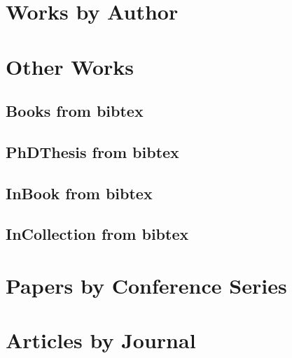 \documentclass[a4paper]{article}
\begin{document}


\clearpage
\section{Works by Author}



\clearpage
\section{Other Works}

\clearpage
\subsection{Books from bibtex}


\clearpage
\subsection{PhDThesis from bibtex}


\clearpage



\clearpage
\subsection{InBook from bibtex}


\clearpage


\clearpage
\subsection{InCollection from bibtex}


\clearpage


\clearpage
\section{Papers by Conference Series}



\clearpage
\section{Articles by Journal}


\end{document}
